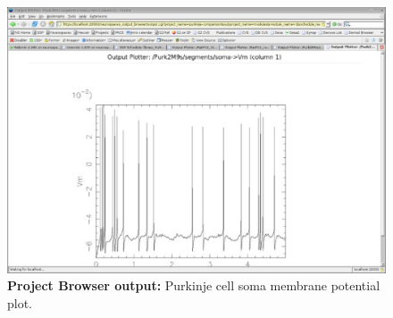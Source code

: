\documentclass[12pt]{article}
\begin{document}
\begin{figure}[h]
  \centering
 \includegraphics[scale=0.6]{figures/screenshot-4.eps}
 \caption{{\bf Project Browser output:} Purkinje cell soma membrane potential plot.}
  \label{fig:pb-4}
\end{figure}


\end{document}
